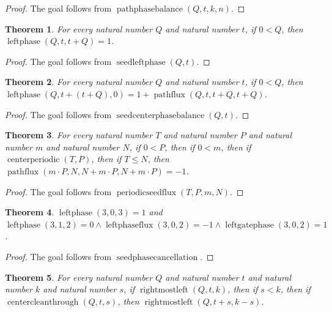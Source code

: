 \documentclass[11pt]{article}
\newtheorem{theorem}{Theorem}[section]
\theoremstyle{definition}
\begin{document}
\begin{proof}
The goal follows from \(\operatorname{pathphasebalance}(Q, t, k, n)\).
\end{proof}
\begin{theorem}
\label{ll:observations:seed-left-phase}
For every natural number \(Q\) and natural number \(t\), if \(0 < Q\), then \(\operatorname{leftphase}(Q, t, t + Q) = 1\).
\end{theorem}
\begin{proof}
The goal follows from \(\operatorname{seedleftphase}(Q, t)\).
\end{proof}
\begin{theorem}
\label{ll:observations:seed-center-phase-balance}
For every natural number \(Q\) and natural number \(t\), if \(0 < Q\), then \(\operatorname{leftphase}(Q, t + (t + Q), 0) = 1 + \operatorname{pathflux}(Q, t, t + Q, t + Q)\).
\end{theorem}
\begin{proof}
The goal follows from \(\operatorname{seedcenterphasebalance}(Q, t)\).
\end{proof}
\begin{theorem}
\label{ll:observations:periodic-seed-flux}
For every natural number \(T\) and natural number \(P\) and natural number \(m\) and natural number \(N\), if \(0 < P\), then if \(0 < m\), then if \(\operatorname{centerperiodic}(T, P)\), then if \(T \le N\), then \(\operatorname{pathflux}(m \cdot P, N, N + m \cdot P, N + m \cdot P) = -1\).
\end{theorem}
\begin{proof}
The goal follows from \(\operatorname{periodicseedflux}(T, P, m, N)\).
\end{proof}
\begin{theorem}
\label{ll:observations:seed-phase-cancellation}
\(\operatorname{leftphase}(3, 0, 3) = 1\) and \(\operatorname{leftphase}(3, 1, 2) = 0 \land \operatorname{leftphaseflux}(3, 0, 2) = -1 \land \operatorname{leftgatephase}(3, 0, 2) = 1\).
\end{theorem}
\begin{proof}
The goal follows from \(\operatorname{seedphasecancellation}\).
\end{proof}
\begin{theorem}
\label{ll:observations:rightmost-left-profile}
For every natural number \(Q\) and natural number \(t\) and natural number \(k\) and natural number \(s\), if \(\operatorname{rightmostleft}(Q, t, k)\), then if \(s < k\), then if \(\operatorname{centercleanthrough}(Q, t, s)\), then \(\operatorname{rightmostleft}(Q, t + s, k - s)\).
\end{theorem}
\end{document}
